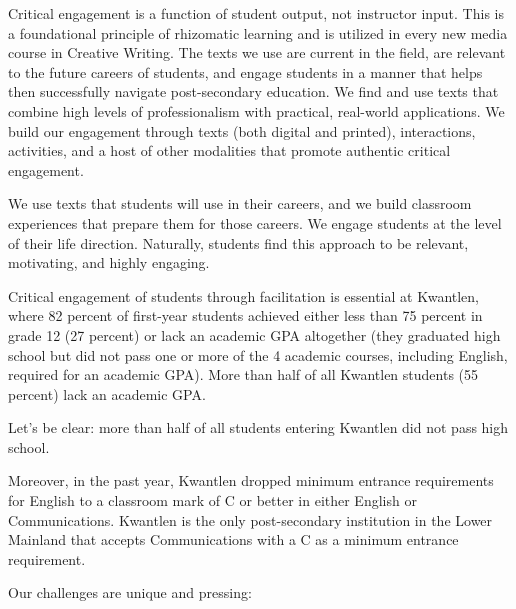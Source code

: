 \documentclass[letterpaper,10pt,headsepline]{scrreprt}
\begin{document}
Critical engagement is a function of student output, not instructor input. This is a foundational principle of rhizomatic learning and is utilized in every new media course in Creative Writing. The texts we use are current in the field, are relevant to the future careers of students, and engage students in a manner that helps then successfully navigate post-secondary education. We find and use texts that combine high levels of professionalism with practical, real-world applications. We build our engagement through texts (both digital and printed), interactions, activities, and a host of other modalities that promote authentic critical engagement.

We use texts that students will use in their careers, and we build classroom experiences that prepare them for those careers. We engage students at the level of their life direction. Naturally, students find this approach to be relevant, motivating, and highly engaging.

Critical engagement of students through facilitation is essential at Kwantlen, where 82 percent of first-year students achieved either less than 75 percent in grade 12 (27 percent) or lack an academic GPA altogether (they graduated high school but did not pass one or more of the 4 academic courses, including English, required for an academic GPA). More than half of all Kwantlen students (55 percent) lack an academic GPA.

\vspace{10 pt} 
Let's be clear: more than half of all students entering Kwantlen did not pass high school.
\vspace{10 pt} 

Moreover, in the past year, Kwantlen dropped minimum entrance requirements for English to a classroom mark of C or better in either English or Communications. Kwantlen is the only post-secondary institution in the Lower Mainland that accepts Communications with a C as a minimum entrance requirement. 

Our challenges are unique and pressing:
\end{document}
